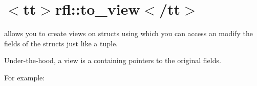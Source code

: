 \chapter{\texorpdfstring{$<$}{<}tt\texorpdfstring{$>$}{>}rfl\+::to\+\_\+view\texorpdfstring{$<$}{<}/tt\texorpdfstring{$>$}{>}}
\hypertarget{md_external_2reflect-cpp_2docs_2to__view}{}\label{md_external_2reflect-cpp_2docs_2to__view}
\label{md_external_2reflect-cpp_2docs_2to__view_autotoc_md703}%
%


{\ttfamily {}} allows you to create views on structs using which you can access an modify the fields of the structs just like a tuple.

Under-\/the-\/hood, a view is a {\ttfamily {}} containing pointers to the original fields.

For example\+:


